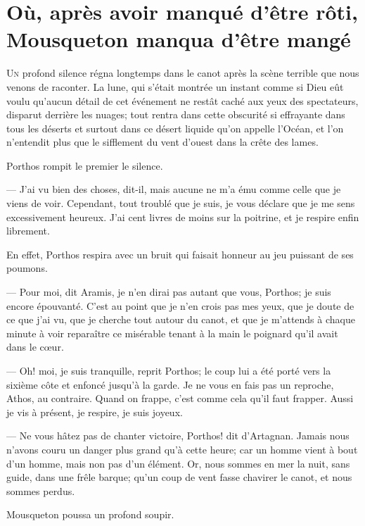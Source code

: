 \chapter{Où, après avoir manqué d'être rôti, Mousqueton manqua d'être mangé}

\lettrine{U}{n} profond silence régna longtemps dans le canot après la scène terrible que nous venons de raconter. La lune, qui s'était montrée un instant comme si Dieu eût voulu qu'aucun détail de cet événement ne restât caché aux yeux des spectateurs, disparut derrière les nuages; tout rentra dans cette obscurité si effrayante dans tous les déserts et surtout dans ce désert liquide qu'on appelle l'Océan, et l'on n'entendit plus que le sifflement du vent d'ouest dans la crête des lames.

Porthos rompit le premier le silence.

— J'ai vu bien des choses, dit-il, mais aucune ne m'a ému comme celle que je viens de voir. Cependant, tout troublé que je suis, je vous déclare que je me sens excessivement heureux. J'ai cent livres de moins sur la poitrine, et je respire enfin librement.

En effet, Porthos respira avec un bruit qui faisait honneur au jeu puissant de ses poumons.

— Pour moi, dit Aramis, je n'en dirai pas autant que vous, Porthos; je suis encore épouvanté. C'est au point que je n'en crois pas mes yeux, que je doute de ce que j'ai vu, que je cherche tout autour du canot, et que je m'attends à chaque minute à voir reparaître ce misérable tenant à la main le poignard qu'il avait dans le cœur.

— Oh! moi, je suis tranquille, reprit Porthos; le coup lui a été porté vers la sixième côte et enfoncé jusqu'à la garde. Je ne vous en fais pas un reproche, Athos, au contraire. Quand on frappe, c'est comme cela qu'il faut frapper. Aussi je vis à présent, je respire, je suis joyeux.

— Ne vous hâtez pas de chanter victoire, Porthos! dit d'Artagnan. Jamais nous n'avons couru un danger plus grand qu'à cette heure; car un homme vient à bout d'un homme, mais non pas d'un élément. Or, nous sommes en mer la nuit, sans guide, dans une frêle barque; qu'un coup de vent fasse chavirer le canot, et nous sommes perdus.

Mousqueton poussa un profond soupir.

